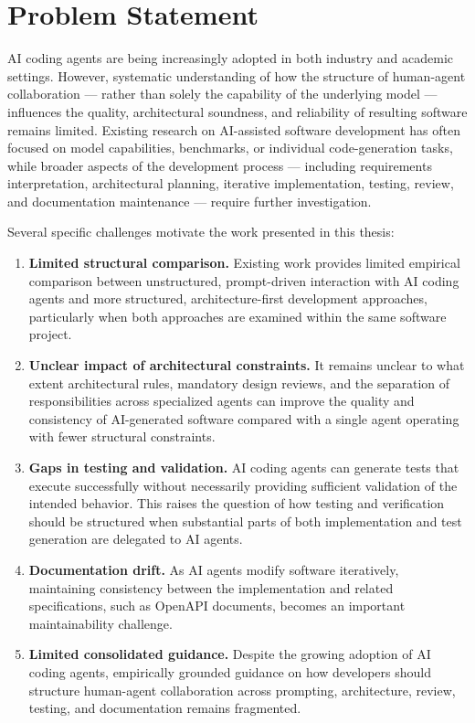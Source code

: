 \section{Problem Statement}

AI coding agents are being increasingly adopted in both industry and academic settings. However, systematic understanding of how the structure of human-agent collaboration --- rather than solely the capability of the underlying model --- influences the quality, architectural soundness, and reliability of resulting software remains limited. Existing research on AI-assisted software development has often focused on model capabilities, benchmarks, or individual code-generation tasks, while broader aspects of the development process --- including requirements interpretation, architectural planning, iterative implementation, testing, review, and documentation maintenance --- require further investigation.

Several specific challenges motivate the work presented in this thesis:

\begin{enumerate}
    \item \textbf{Limited structural comparison.} Existing work provides limited empirical comparison between unstructured, prompt-driven interaction with AI coding agents and more structured, architecture-first development approaches, particularly when both approaches are examined within the same software project.
    \item \textbf{Unclear impact of architectural constraints.} It remains unclear to what extent architectural rules, mandatory design reviews, and the separation of responsibilities across specialized agents can improve the quality and consistency of AI-generated software compared with a single agent operating with fewer structural constraints.
    \item \textbf{Gaps in testing and validation.} AI coding agents can generate tests that execute successfully without necessarily providing sufficient validation of the intended behavior. This raises the question of how testing and verification should be structured when substantial parts of both implementation and test generation are delegated to AI agents.
    \item \textbf{Documentation drift.} As AI agents modify software iteratively, maintaining consistency between the implementation and related specifications, such as OpenAPI documents, becomes an important maintainability challenge.
    \item \textbf{Limited consolidated guidance.} Despite the growing adoption of AI coding agents, empirically grounded guidance on how developers should structure human-agent collaboration across prompting, architecture, review, testing, and documentation remains fragmented.
\end{enumerate}

